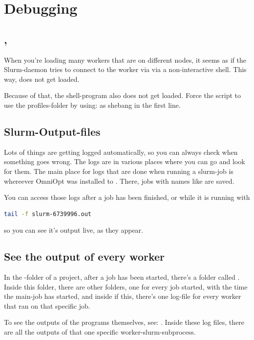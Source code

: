 \documentclass[]{scrartcl}
\begin{document}
\section{Debugging}

\subsection{, }

When you're loading many workers that are on different nodes, it seems as if the Slurm-daemon tries to connect to
the worker via  via a non-interactive shell. This way,  does not get loaded.

Because of that, the shell-program  also does not get loaded. Force the script to use the profiles-folder
by using:  as shebang in the first line.

\subsection{Slurm-Output-files}

Lots of things are getting logged automatically, so you can always check when something goes wrong. The logs are in various places
where you can go and look for them. The main place for logs that are done when running a slurm-job is whereever OmniOpt was 
installed to . There, jobs with names like  are saved.

You can access those logs after a job has been finished, or while it is running with

\begin{lstlisting}[language=bash]
tail -f slurm-6739996.out
\end{lstlisting}

so you can see it's output live, as they appear.

\subsection{See the output of every worker}

In the -folder of a project, after a job has been started, there's a folder
called . Inside this folder, there are other folders, one for every job started, with the time the main-job has started, and
inside if this, there's one log-file for every worker that ran on that specific job.

To see the outputs of the programs themselves, see: . Inside these log files, 
there are all the outputs of that one specific worker-slurm-subprocess.
\end{document}
